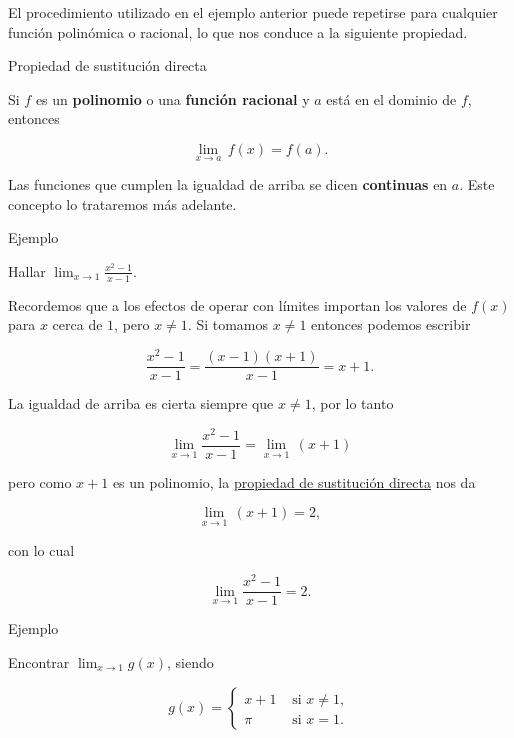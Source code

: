 \documentclass[
  letterpaper,
]{book}
\theoremstyle{plain}
\theoremstyle{remark}
\begin{document}
El procedimiento utilizado en el ejemplo anterior puede repetirse para
cualquier función polinómica o racional, lo que nos conduce a la
siguiente propiedad.

\label{teo-sust-directa}
Propiedad de sustitución directa

Si \(f\) es un \textbf{polinomio} o una \textbf{función racional} y
\(a\) está en el dominio de \(f\), entonces

\[
\lim_{x\to a}\, f(x)=f(a).
\]

Las funciones que cumplen la igualdad de arriba se dicen
\textbf{continuas} en \(a\). Este concepto lo trataremos más adelante.

\label{ejemplo-cuadratica-lineal}
Ejemplo

Hallar \(\displaystyle \lim_{x\to 1} \frac{x^2-1}{x-1}\).

\begin{tcolorbox}[enhanced jigsaw, opacityback=0, left=2mm, opacitybacktitle=0.6, toprule=.15mm, bottomrule=.15mm, colbacktitle=quarto-callout-tip-color!10!white, titlerule=0mm, bottomtitle=1mm, title=\textcolor{quarto-callout-tip-color}{\faLightbulb}\hspace{0.5em}{Solución}, toptitle=1mm, colframe=quarto-callout-tip-color-frame, colback=white, breakable, rightrule=.15mm, arc=.35mm, leftrule=.75mm, coltitle=black]

Recordemos que a los efectos de operar con límites importan los valores
de \(f(x)\) para \(x\) cerca de \(1\), pero \(x\neq 1\). Si tomamos
\(x\neq 1\) entonces podemos escribir

\[
\frac{x^2-1}{x-1}=\frac{(x-1)(x+1)}{x-1}=x+1.
\]

La igualdad de arriba es cierta siempre que \(x\neq 1\), por lo tanto

\[
\lim_{x\to 1} \frac{x^2-1}{x-1}=\lim_{x\to 1}\, (x+1)
\]

pero como \(x+1\) es un polinomio, la
\hyperref[teo-sust-directa]{propiedad de sustitución directa} nos da

\[
\lim_{x\to 1}\, (x+1) =2,
\]

con lo cual

\[
\lim_{x\to 1} \frac{x^2-1}{x-1}=2.
\]

\end{tcolorbox}

Ejemplo

Encontrar \(\displaystyle \lim_{x\to 1} g(x)\), siendo

\[
g(x)=
\begin{cases}
x+1 & \text{ si } x\neq 1,\\
\pi & \text{ si } x=1.
\end{cases}
\]
\end{document}
